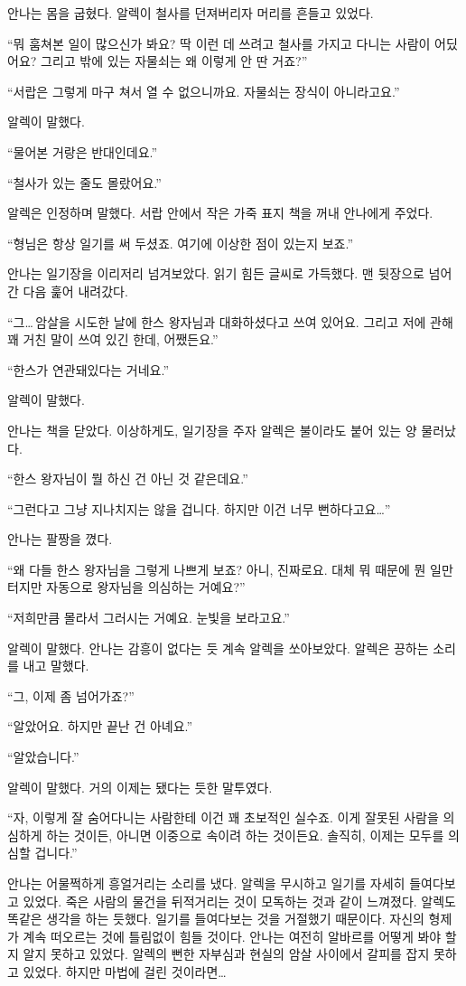 안나는 몸을 굽혔다. 알렉이 철사를 던져버리자 머리를 흔들고 있었다.

``뭐 훔쳐본 일이 많으신가 봐요? 딱 이런 데 쓰려고 철사를 가지고 다니는 사람이 어딨어요? 그리고 밖에 있는 자물쇠는 왜 이렇게 안 딴 거죠?''

``서랍은 그렇게 마구 쳐서 열 수 없으니까요. 자물쇠는 장식이 아니라고요.''

알렉이 말했다.

`` 물어본 거랑은 반대인데요.''

``철사가 있는 줄도 몰랐어요.''

알렉은 인정하며 말했다. 서랍 안에서 작은 가죽 표지 책을 꺼내 안나에게 주었다.

``형님은 항상 일기를 써 두셨죠. 여기에 이상한 점이 있는지 보죠.''

안나는 일기장을 이리저리 넘겨보았다. 읽기 힘든 글씨로 가득했다. 맨 뒷장으로 넘어간 다음 훑어 내려갔다.

``그\ldots\,암살을 시도한 날에 한스 왕자님과 대화하셨다고 쓰여 있어요. 그리고 저에 관해 꽤 거친 말이 쓰여 있긴 한데, 어쨌든요.''

``한스가 연관돼있다는 거네요.''

알렉이 말했다.

안나는 책을 닫았다. 이상하게도, 일기장을 주자 알렉은 불이라도 붙어 있는 양 물러났다.

``한스 왕자님이 뭘 하신 건 아닌 것 같은데요.''

``그런다고 그냥 지나치지는 않을 겁니다. 하지만 이건 너무 뻔하다고요\ldots''

안나는 팔짱을 꼈다.

``왜 다들 한스 왕자님을 그렇게 나쁘게 보죠? 아니, 진짜로요. 대체 뭐 때문에 뭔 일만 터지만 자동으로 왕자님을 의심하는 거예요?''

``저희만큼 몰라서 그러시는 거예요. 눈빛을 보라고요.''

알렉이 말했다. 안나는 감흥이 없다는 듯 계속 알렉을 쏘아보았다. 알렉은 끙하는 소리를 내고 말했다.

``그, 이제 좀 넘어가죠?''

``알았어요. 하지만 끝난 건 아녜요.''

``알았습니다.''

알렉이 말했다. 거의 이제는 됐다는 듯한 말투였다.

``자, 이렇게 잘 숨어다니는 사람한테 이건 꽤 초보적인 실수죠. 이게 잘못된 사람을 의심하게 하는 것이든, 아니면 이중으로 속이려 하는 것이든요. 솔직히, 이제는 모두를 의심할 겁니다.''

안나는 어물쩍하게 흥얼거리는 소리를 냈다. 알렉을 무시하고 일기를 자세히 들여다보고 있었다. 죽은 사람의 물건을 뒤적거리는 것이 모독하는 것과 같이 느껴졌다. 알렉도 똑같은 생각을 하는 듯했다. 일기를 들여다보는 것을 거절했기 때문이다. 자신의 형제가 계속 떠오르는 것에 틀림없이 힘들 것이다. 안나는 여전히 알바르를 어떻게 봐야 할지 알지 못하고 있었다. 알렉의 뻔한 자부심과 현실의 암살 사이에서 갈피를 잡지 못하고 있었다. 하지만 마법에 걸린 것이라면\ldots

